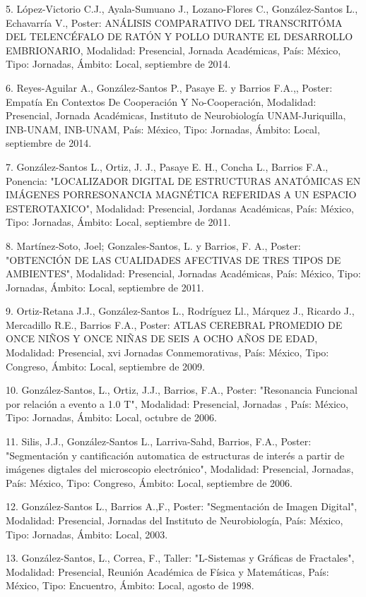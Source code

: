 \documentclass[12pt]{article}
\begin{document}
5. López-Victorio C.J., Ayala-Sumuano J., Lozano-Flores C., González-Santos L., Echavarría V., Poster: ANÁLISIS COMPARATIVO DEL 
TRANSCRITÓMA DEL TELENCÉFALO DE RATÓN Y POLLO DURANTE EL DESARROLLO EMBRIONARIO, Modalidad: Presencial, Jornada Académicas, País: 
México, Tipo: Jornadas, Ámbito: Local, septiembre de 2014.

6. Reyes-Aguilar A., González-Santos P., Pasaye E. y Barrios F.A.,, Poster: Empatía En Contextos De Cooperación Y No-Cooperación, 
Modalidad: Presencial, Jornada Académicas, Instituto de Neurobiología UNAM-Juriquilla, INB-UNAM, INB-UNAM, País: México, Tipo: 
Jornadas, Ámbito: Local, septiembre de 2014.

7. González-Santos L., Ortiz, J. J., Pasaye E. H., Concha L., Barrios F.A., Ponencia: "LOCALIZADOR DIGITAL DE ESTRUCTURAS ANATÓMICAS EN 
IMÁGENES PORRESONANCIA MAGNÉTICA REFERIDAS A UN ESPACIO ESTEROTAXICO", Modalidad: Presencial, Jordanas Académicas, País: México, Tipo: 
Jornadas, Ámbito: Local, septiembre de 2011.

8. Martínez-Soto, Joel; Gonzales-Santos, L. y Barrios, F. A., Poster: "OBTENCIÓN DE LAS CUALIDADES AFECTIVAS DE TRES TIPOS DE 
AMBIENTES", Modalidad: Presencial, Jornadas Académicas, País: México, Tipo: Jornadas, Ámbito: Local, septiembre de 2011.

9. Ortiz-Retana J.J., González-Santos L., Rodríguez Ll., Márquez J., Ricardo J., Mercadillo R.E., Barrios F.A., Poster: ATLAS CEREBRAL 
PROMEDIO DE ONCE NIÑOS Y ONCE NIÑAS DE SEIS A OCHO AÑOS DE EDAD, Modalidad: Presencial, xvi Jornadas Conmemorativas, País: México, 
Tipo: Congreso, Ámbito: Local, septiembre de 2009.

10. González-Santos, L., Ortiz, J.J., Barrios, F.A., Poster: "Resonancia Funcional por relación a evento a 1.0 T", Modalidad: 
Presencial, Jornadas , País: México, Tipo: Jornadas, Ámbito: Local, octubre de 2006.

11. Silis, J.J., González-Santos L., Larriva-Sahd, Barrios, F.A., Poster: "Segmentación y cantificación automatica de estructuras de 
interés a partir de imágenes digtales del microscopio electrónico", Modalidad: Presencial, Jornadas, País: México, Tipo: Congreso, 
Ámbito: Local, septiembre de 2006.

12. González-Santos L., Barrios A.,F., Poster: "Segmentación de Imagen Digital", Modalidad: Presencial, Jornadas del Instituto de 
Neurobiología, País: México, Tipo: Jornadas, Ámbito: Local, 2003.

13. González-Santos, L., Correa, F., Taller: "L-Sistemas y Gráficas de Fractales", Modalidad: Presencial, Reunión Académica de Física y 
Matemáticas, País: México, Tipo: Encuentro, Ámbito: Local, agosto de 1998.
\end{document}
